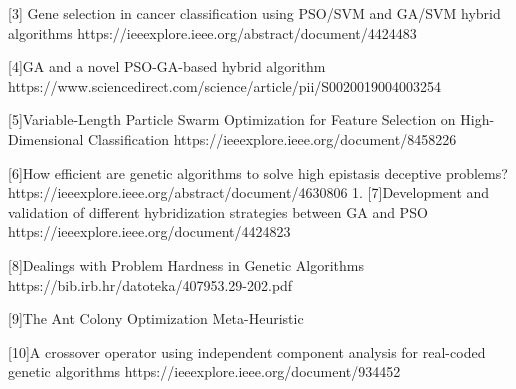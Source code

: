 \documentclass[twocolumn]{article}
\begin{document}
[3] Gene selection in cancer classification using PSO/SVM and GA/SVM hybrid algorithms
https://ieeexplore.ieee.org/abstract/document/4424483

[4]GA and a novel PSO-GA-based hybrid algorithm
https://www.sciencedirect.com/science/article/pii/S0020019004003254

[5]Variable-Length Particle Swarm Optimization for Feature Selection on High-Dimensional Classification
https://ieeexplore.ieee.org/document/8458226

[6]How efficient are genetic algorithms to solve high epistasis deceptive problems?
https://ieeexplore.ieee.org/abstract/document/4630806
    1. [7]Development and validation of different hybridization strategies between GA and PSO
https://ieeexplore.ieee.org/document/4424823

[8]Dealings with Problem Hardness in Genetic Algorithms
https://bib.irb.hr/datoteka/407953.29-202.pdf

[9]The Ant Colony Optimization Meta-Heuristic

[10]A crossover operator using independent component analysis for real-coded genetic algorithms
https://ieeexplore.ieee.org/document/934452


	
	
\end{document}
